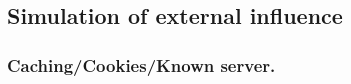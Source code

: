 







\subsection{Simulation of external influence}\label{Sec:ExtInfls}

\subsubsection*{Caching/Cookies/Known server.}

